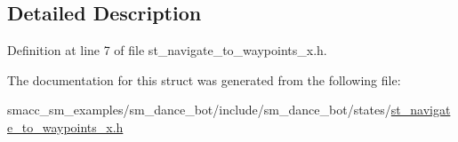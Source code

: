 \subsection{Detailed Description}


Definition at line 7 of file st\+\_\+navigate\+\_\+to\+\_\+waypoints\+\_\+x.\+h.



The documentation for this struct was generated from the following file\+:\begin{DoxyCompactItemize}
\item 
smacc\+\_\+sm\+\_\+examples/sm\+\_\+dance\+\_\+bot/include/sm\+\_\+dance\+\_\+bot/states/\hyperlink{st__navigate__to__waypoints__x_8h}{st\+\_\+navigate\+\_\+to\+\_\+waypoints\+\_\+x.\+h}\end{DoxyCompactItemize}
